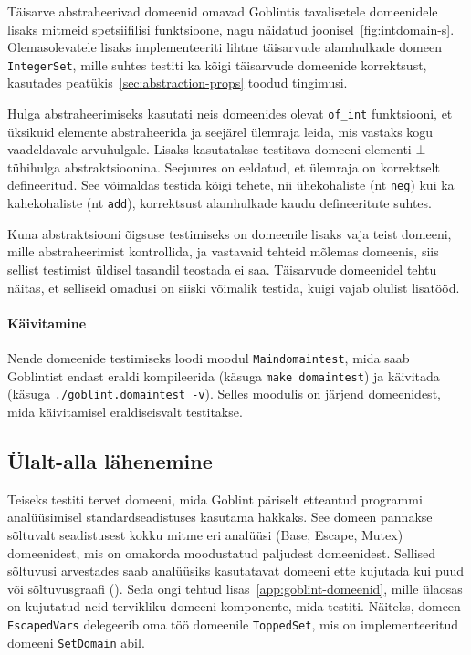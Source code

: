 \documentclass[../thesis.tex]{subfiles}
\begin{document}
Täisarve abstraheerivad domeenid omavad Goblintis tavalisetele domeenidele lisaks mitmeid spetsiifilisi funktsioone, nagu näidatud joonisel~\ref{fig:intdomain-s}.
Olemasolevatele lisaks implementeeriti lihtne täisarvude alamhulkade domeen \texttt{IntegerSet}, mille suhtes testiti ka kõigi täisarvude domeenide korrektsust, kasutades peatükis~\ref{sec:abstraction-props} toodud tingimusi.

Hulga abstraheerimiseks kasutati neis domeenides olevat \texttt{of\_int} funktsiooni, et üksikuid elemente abstraheerida ja seejärel ülemraja leida, mis vastaks kogu vaadeldavale arvuhulgale. Lisaks kasutatakse testitava domeeni elementi $\bot$ tühihulga abstraktsioonina. Seejuures on eeldatud, et ülemraja on korrektselt defineeritud. See võimaldas testida kõigi tehete, nii ühekohaliste (nt \texttt{neg}) kui ka kahekohaliste (nt \texttt{add}), korrektsust alamhulkade kaudu defineeritute suhtes.

Kuna abstraktsiooni õigsuse testimiseks on domeenile lisaks vaja teist domeeni, mille abstraheerimist kontrollida, ja vastavaid tehteid mõlemas domeenis, siis sellist testimist üldisel tasandil teostada ei saa. Täisarvude domeenidel tehtu näitas, et selliseid omadusi on siiski võimalik testida, kuigi vajab olulist lisatööd.

\paragraph{Käivitamine}
Nende domeenide testimiseks loodi moodul \texttt{Maindomaintest}, mida saab Goblintist endast eraldi kompileerida (käsuga \texttt{make domaintest}) ja käivitada (käsuga \texttt{./goblint.domaintest -v}). Selles moodulis on järjend domeenidest, mida käivitamisel eraldiseisvalt testitakse.

\subsection{Ülalt-alla lähenemine}
Teiseks testiti tervet domeeni, mida Goblint päriselt etteantud programmi analüüsimisel standardseadistuses kasutama hakkaks. See domeen pannakse sõltuvalt seadistusest kokku mitme eri analüüsi (Base, Escape, Mutex) domeenidest, mis on omakorda moodustatud paljudest domeenidest. Sellised sõltuvusi arvestades saab analüüsiks kasutatavat domeeni ette kujutada kui puud või sõltuvusgraafi (). Seda ongi tehtud lisas~\ref{app:goblint-domeenid}, mille ülaosas on kujutatud neid tervikliku domeeni komponente, mida testiti.
Näiteks, domeen \texttt{EscapedVars} delegeerib oma töö domeenile \texttt{ToppedSet}, mis on implementeeritud domeeni \texttt{SetDomain} abil.
\end{document}
